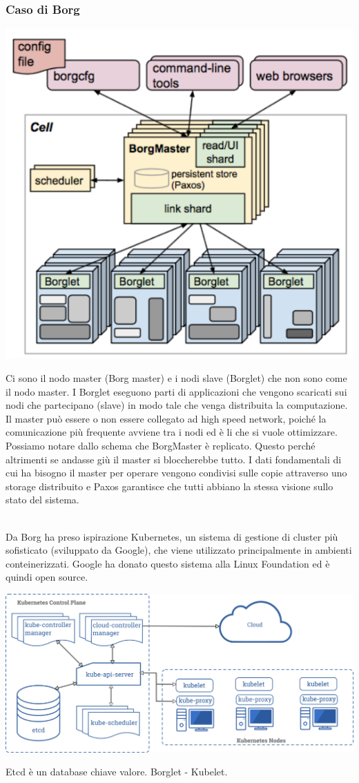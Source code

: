 \subsubsection{Caso di Borg}
\begin{center}
    \includegraphics[width = .5\textwidth]{images/lezione1/borg.PNG}
\end{center}

Ci sono il nodo master (Borg master) e i nodi slave (Borglet) che non sono come il nodo master. I Borglet eseguono parti di applicazioni che vengono scaricati sui nodi che partecipano (slave) in modo tale che venga distribuita la computazione.\\
Il master può essere o non essere collegato ad high speed network, poiché la comunicazione più frequente avviene tra i nodi ed è li che si vuole ottimizzare.\\
Possiamo notare dallo schema che BorgMaster è replicato. Questo perché altrimenti se andasse giù il master si bloccherebbe tutto. I dati fondamentali di cui ha bisogno il master per operare vengono condivisi sulle copie attraverso uno storage distribuito e Paxos garantisce che tutti abbiano la stessa visione sullo stato del sistema.\\\

Da Borg ha preso ispirazione Kubernetes, un sistema di gestione di cluster più sofisticato (sviluppato da Google), che viene utilizzato principalmente in ambienti conteinerizzati. Google ha donato questo sistema alla Linux Foundation ed è quindi open source. 
\begin{center}
    \includegraphics[width = .8\textwidth]{images/lezione1/kubernetes.png}
\end{center}
Etcd è un database chiave valore. Borglet - Kubelet.

